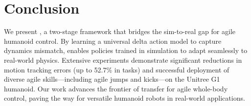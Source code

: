 \section{Conclusion}
\label{sec:conclusion}
We present \method, a two-stage framework that bridges the sim-to-real gap for agile humanoid control. By learning a universal delta action model to capture dynamics mismatch, \method enables policies trained in simulation to adapt seamlessly to real-world physics. Extensive experiments demonstrate significant reductions in motion tracking errors (up to 52.7\% in \simtoreal
tasks) and successful deployment of diverse agile skills—including agile jumps and kicks—on the Unitree G1 humanoid. Our work advances the frontier of \simtoreal transfer for agile whole-body control, paving the way for versatile humanoid robots in real-world applications.
